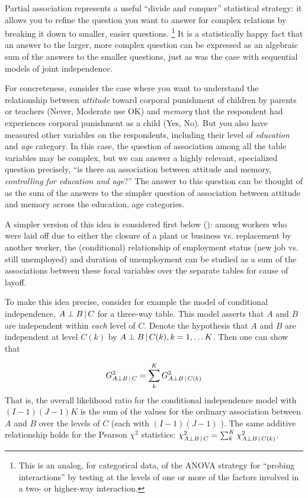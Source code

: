 \documentclass[10pt,krantz2]{krantz}\usepackage[]{graphicx}\usepackage[]{color}
\begin{document}
Partial association represents a useful ``divide and conquer'' statistical strategy:
it allows you to refine the question you want to answer for complex relations
by breaking it down to smaller, easier questions.%
\footnote{
This is an analog, for categorical data, of the ANOVA strategy for ``probing interactions''
by testing  at the levels of one or more of the
factors involved in a two- or higher-way interaction.
}
It is a statistically
happy fact that an answer to the larger, more complex question
can be expressed as an algebraic sum of the answers to the smaller questions,
just as was the case with sequential models of joint independence.

For concreteness, consider the case where you want to understand the
relationship between \emph{attitude} toward corporal punishment of children
by parents or teachers (Never, Moderate use OK) and \emph{memory}
that the respondent had experiences corporal punishment as a child (Yes, No).
But you also have measured other variables on the respondents, including their
level of \emph{education} and \emph{age} category.  In this case, the
question of association among all the table variables may be complex,
but we can answer a highly relevant, specialized question
precisely,
``is there an association between attitude and memory,
\emph{controlling for education and age}?''
The answer to this question can be thought of as the sum of the
answers to the simpler question of association between attitude and memory
across the education, age categories.

A simpler version of this idea is considered first below ():
among workers who were laid off
due to either the closure of a plant or business vs.
replacement by another worker,
the (conditional)
relationship of employment status (new job vs. still unemployed)
and duration of unemployment can be studied as a sum of the
associations between these focal variables over the separate tables
for cause of layoff.

To make this idea precise, consider for example the model of conditional independence, $A\perp B\, | \, C$
for a three-way table. This model asserts that $A$ and $B$ are independent
within \textit{each} level of $C$. Denote the hypothesis that $A$ and $B$
are independent at level $C(k)$ by $A\perp B\, | \, C(k), k=1, \dots K$. Then one can show
\citep{Andersen:91} that

\begin{equation}\label{eq:partial1}
G_{A\perp B\given C}^2=\sum_k^K G_{A\perp B\given C(k)}^2
\end{equation}
That is, the overall likelihood ratio \GSQ for the conditional independence model
with $(I-1)(J-1)K$ \df{} is the
sum of the values for the ordinary association between $A$ and $B$ over the levels of
$C$ (each with $(I-1)(J-1)$ \df{}). The same additive relationship holds for the
Pearson $\chi^2$ statistics: $\chi^2_{A\perp B\, | \, C}=\sum_k^K \chi^2_{A\perp B\, | \, C(k)}$.
\end{document}
